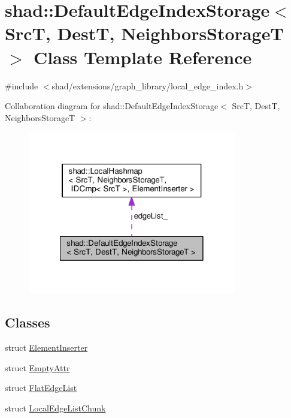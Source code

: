 \hypertarget{classshad_1_1DefaultEdgeIndexStorage}{\section{shad\-:\-:Default\-Edge\-Index\-Storage$<$ Src\-T, Dest\-T, Neighbors\-Storage\-T $>$ Class Template Reference}
\label{classshad_1_1DefaultEdgeIndexStorage}
}


{\ttfamily \#include $<$shad/extensions/graph\-\_\-library/local\-\_\-edge\-\_\-index.\-h$>$}



Collaboration diagram for shad\-:\-:Default\-Edge\-Index\-Storage$<$ Src\-T, Dest\-T, Neighbors\-Storage\-T $>$\-:
\nopagebreak
\begin{figure}[H]
\begin{center}
\leavevmode
\includegraphics[width=258pt]{classshad_1_1DefaultEdgeIndexStorage__coll__graph}
\end{center}
\end{figure}
\subsection*{Classes}
\begin{DoxyCompactItemize}
\item 
struct \hyperlink{structshad_1_1DefaultEdgeIndexStorage_1_1ElementInserter}{Element\-Inserter}
\item 
struct \hyperlink{structshad_1_1DefaultEdgeIndexStorage_1_1EmptyAttr}{Empty\-Attr}
\item 
struct \hyperlink{structshad_1_1DefaultEdgeIndexStorage_1_1FlatEdgeList}{Flat\-Edge\-List}
\item 
struct \hyperlink{structshad_1_1DefaultEdgeIndexStorage_1_1LocalEdgeListChunk}{Local\-Edge\-List\-Chunk}
\end{DoxyCompactItemize}
